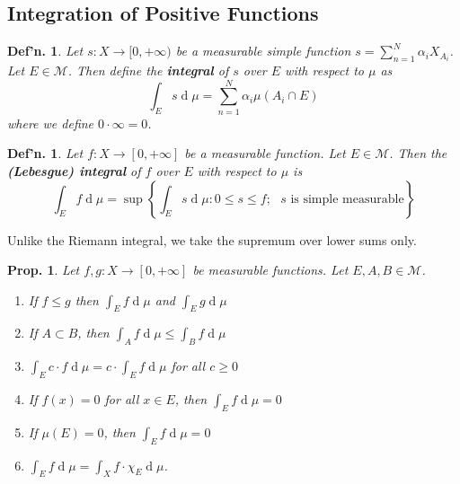 \documentclass[12pt, a4paper]{book}
\renewcommand{\d}[1]{\ensuremath{\operatorname{d}\!{#1}}} %
\newtheorem{definition}[theorem]{Def'n.}
\newtheorem{proposition}[theorem]{Prop.}
\theoremstyle{nonumberplain}
\begin{document}
\subsection{Integration of Positive Functions}
\begin{definition}
    Let $s:X\to[0,+\infty)$ be a measurable simple function $s=\sum\limits_{n=1}^N\alpha_i X_{A_i}$. %
    Let $E\in\mathcal{M}$.
    Then define the \textbf{integral} of $s$ over $E$ with respect to $\mu$ as
    \[\int_E s\d{\mu}=\sum\limits_{n=1}^N\alpha_i\mu(A_i\cap E)\]
    where we define $0\cdot\infty=0$.
\end{definition}
\begin{definition}
    Let $f:X\to[0,+\infty]$ be a measurable function.
    Let $E\in\mathcal{M}$.
    Then the \textbf{(Lebesgue) integral} of $f$ over $E$ with respect to $\mu$ is
    \[\int_E f\d{\mu}=\sup\left\{\int_E s\d{\mu}:0\leq s\leq f;\text{ $s$ is simple measurable}\right\}\]
\end{definition}
Unlike the Riemann integral, we take the supremum over lower sums only.
\begin{proposition}
    Let $f,g:X\to[0,+\infty]$ be measurable functions.
    Let $E,A,B\in\mathcal{M}$.
    \begin{enumerate}[nolistsep]
        \item If $f\leq g$ then $\int_E f\d{\mu}$ and $\int_E g\d{\mu}$
        \item If $A\subset B$, then $\int_A f\d{\mu}\leq \int_B f\d{\mu}$
        \item $\int_E c\cdot f\d{\mu}=c\cdot\int_E f\d{\mu}$ for all $c\geq 0$
        \item If $f(x)=0$ for all $x\in E$, then $\int_E f\d{\mu}=0$
        \item If $\mu(E)=0$, then $\int_E f\d{\mu}=0$
        \item $\int_E f\d{\mu}=\int_X f\cdot \chi_E\d{\mu}$.
    \end{enumerate}
\end{proposition}
\end{document}
